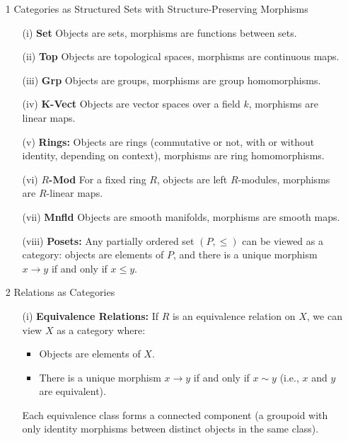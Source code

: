 \documentclass[11pt]{article}
\theoremstyle{definition}
\theoremstyle{plain}
\begin{document}
\begin{itemize}
    \item [1]Categories as Structured Sets with Structure-Preserving Morphisms
          \begin{itemize}
              \item[(i)] \textbf{Set} Objects are sets, morphisms are functions between sets.
              \item[(ii)] \textbf{Top} Objects are topological spaces, morphisms are continuous maps.
              \item[(iii)] \textbf{Grp} Objects are groups, morphisms are group homomorphisms.
              \item[(iv)] \textbf{K-Vect} Objects are vector spaces over a field $k$, morphisms are linear maps.
              \item[(v)] \textbf{Rings:} Objects are rings (commutative or not, with or without identity, depending on context), morphisms are ring homomorphisms.
              \item[(vi)] \textbf{$R$-Mod} For a fixed ring $R$, objects are left $R$-modules, morphisms are $R$-linear maps.
              \item[(vii)] \textbf{Mnfld} Objects are smooth manifolds, morphisms are smooth maps.
              \item[(viii)] \textbf{Posets:} Any partially ordered set $(P, \leq)$ can be viewed as a category: objects are elements of $P$, and there is a unique morphism $x \to y$ if and only if $x \leq y$.
          \end{itemize}
    \item [2]Relations as Categories
          \begin{itemize}
              \item[(i)] \textbf{Equivalence Relations:} If $R$ is an equivalence relation on $X$, we can view $X$ as a category where:
                    \begin{itemize}
                        \item Objects are elements of $X$.
                        \item There is a unique morphism $x \to y$ if and only if $x \sim y$ (i.e., $x$ and $y$ are equivalent).

                    \end{itemize}
                    Each equivalence class forms a connected component (a groupoid with only identity morphisms between distinct objects in the same class).


\end{itemize}
\end{itemize}
\end{document}
